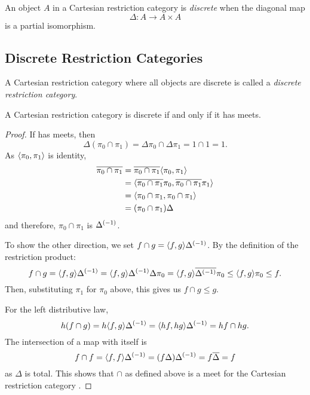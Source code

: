 \begin{definition}
  An object $A$ in a Cartesian restriction category is \emph{discrete}
  when the diagonal map
  \[
    \Delta:A \to A \times A
  \]
  is a partial isomorphism.
\end{definition}



\subsection{Discrete Restriction Categories} %
\label{sub:discrete_restriction_categories}

\begin{definition}\label{def:discrete_restriction_category}
  A  Cartesian restriction category where all objects are
  discrete is called a \emph{discrete restriction category}.
\end{definition}

\begin{theorem}\label{thm:a_crc_is_discrete_iff_it_has_meets}
  A Cartesian restriction category \X is discrete if and only if it has meets.
\end{theorem}
\begin{proof}
  If \X has meets, then
  \[
    \Delta(\pi_0 \cap \pi_1) = \Delta\pi_0 \cap \Delta\pi_1 = 1\cap 1 = 1.
  \]
  As $\langle\pi_0,\pi_1\rangle$ is identity,
  \begin{align*}
    \overline{\pi_0 \cap \pi_1} &= \overline{\pi_0 \cap \pi_1} \langle\pi_0, \pi_1\rangle \\
    &=\langle\overline{\pi_0 \cap \pi_1}\pi_0, \overline{\pi_0 \cap \pi_1}\pi_1\rangle\\
    &=\langle\pi_0 \cap \pi_1,\pi_0 \cap \pi_1\rangle\\
    &=(\pi_0 \cap \pi_1 )\Delta
  \end{align*}
  and therefore, $\pi_0 \cap \pi_1$ is ${\Delta}^{(-1)}$.

  To show the other direction, we set $f\cap g = \langle f,g\rangle{\Delta}^{(-1)}$.
  By the definition of the restriction product:
  \[
    f \cap g =  \langle f,g\rangle{\Delta}^{(-1)} =\langle f,g\rangle{\Delta}^{(-1)} \Delta \pi_0 =
      \langle f,g\rangle\overline{{\Delta}^{(-1)}}\pi_0 \le \langle f,g\rangle\pi_0 \le f.
  \]
  Then, substituting $\pi_1$ for $\pi_0$ above, this gives us $f \cap g \le g$.

  For the left distributive law,
  \[
    h(f \cap g) = h \langle f,g\rangle{\Delta}^{(-1)} =  \langle h f,h g\rangle{\Delta}^{(-1)} = h f \cap h g.
  \]
  The intersection of a map with itself is
  \[
    f\cap f = \langle f,f\rangle {\Delta}^{(-1)} = (f \Delta) {\Delta}^{(-1)} = f \overline{\Delta} = f
  \]
  as $\Delta$ is total. This shows that $\cap$ as defined above is a meet for the
  Cartesian restriction category \X.

\end{proof}

